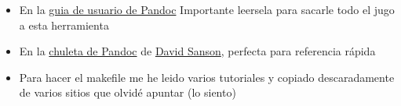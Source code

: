 \documentclass[12pt,spanish,]{article}
\providecommand{\tightlist}{%
  \setlength{\itemsep}{0pt}\setlength{\parskip}{0pt}}
\begin{document}
\begin{itemize}
\tightlist
\item
  En la \href{http://pandoc.org/README.html}{guia de usuario de Pandoc}
  Importante leersela para sacarle todo el jugo a esta herramienta
\item
  En la
  \href{https://github.com/dsanson/Pandoc.tmbundle/blob/master/Support/doc/cheatsheet.markdown}{chuleta
  de Pandoc} de \href{https://github.com/dsanson}{David Sanson},
  perfecta para referencia rápida
\item
  Para hacer el makefile me he leido varios tutoriales y copiado
  descaradamente de varios sitios que olvidé apuntar (lo siento)
\end{itemize}
\end{document}
